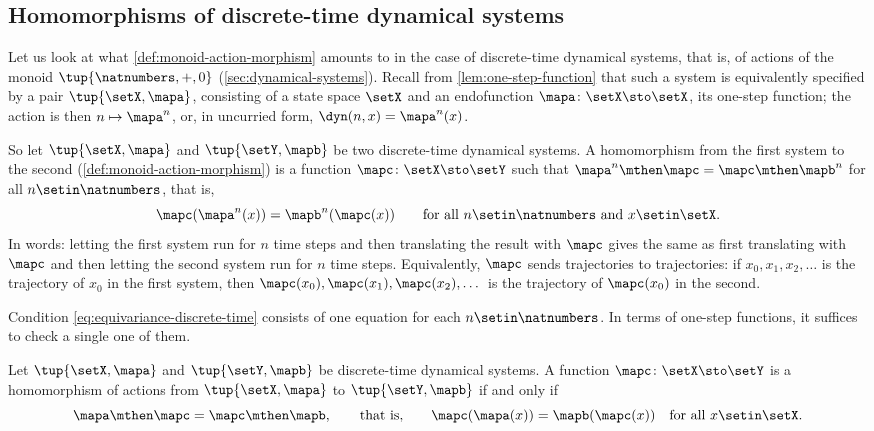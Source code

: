 \subsection{Homomorphisms of discrete-time dynamical systems}
\label{sec:homomorphisms-discrete-time}

Let us look at what \cref{def:monoid-action-morphism} amounts to in the case of discrete-time dynamical systems, that is, of actions of the monoid $\tup{\natnumbers, +, 0}$ (\cref{sec:dynamical-systems}).
Recall from \cref{lem:one-step-function} that such a system is equivalently specified by a pair $\tup{\setX, \mapa}$, consisting of a state space $\setX$ and an endofunction $\mapa \colon \setX \sto \setX$, its one-step function; the action is then $n \mapsto \mapa^n$, or, in uncurried form, $\dyn(n, x) = \mapa^n(x)$.

So let $\tup{\setX, \mapa}$ and $\tup{\setY, \mapb}$ be two discrete-time dynamical systems.
A homomorphism from the first system to the second (\cref{def:monoid-action-morphism}) is a function $\mapc \colon \setX \sto \setY$ such that $\mapa^n \mthen \mapc = \mapc \mthen \mapb^n$ for all $n \setin \natnumbers$, that is,
\begin{equation}
    \label{eq:equivariance-discrete-time}
    \mapc(\mapa^n(x)) = \mapb^n(\mapc(x)) \qquad \text{for all } n \setin \natnumbers \text{ and } x \setin \setX.
\end{equation}
In words: letting the first system run for $n$ time steps and then translating the result with $\mapc$ gives the same as first translating with $\mapc$ and then letting the second system run for $n$ time steps.
Equivalently, $\mapc$ sends trajectories to trajectories: if $x_0, x_1, x_2, \dots$ is the trajectory of $x_0$ in the first system, then $\mapc(x_0), \mapc(x_1), \mapc(x_2), \dots$ is the trajectory of $\mapc(x_0)$ in the second.

Condition \cref{eq:equivariance-discrete-time} consists of one equation for each $n \setin \natnumbers$.
In terms of one-step functions, it suffices to check a single one of them.

\begin{lemma}
    \label{lem:homomorphism-one-step}
    Let $\tup{\setX, \mapa}$ and $\tup{\setY, \mapb}$ be discrete-time dynamical systems.
    A function $\mapc \colon \setX \sto \setY$ is a homomorphism of actions from $\tup{\setX, \mapa}$ to $\tup{\setY, \mapb}$ if and only if
    \begin{equation}
        \label{eq:equivariance-one-step}
        \mapa \mthen \mapc = \mapc \mthen \mapb,
        \qquad \text{that is,} \qquad
        \mapc(\mapa(x)) = \mapb(\mapc(x)) \quad \text{for all } x \setin \setX.
    \end{equation}
\end{lemma}

